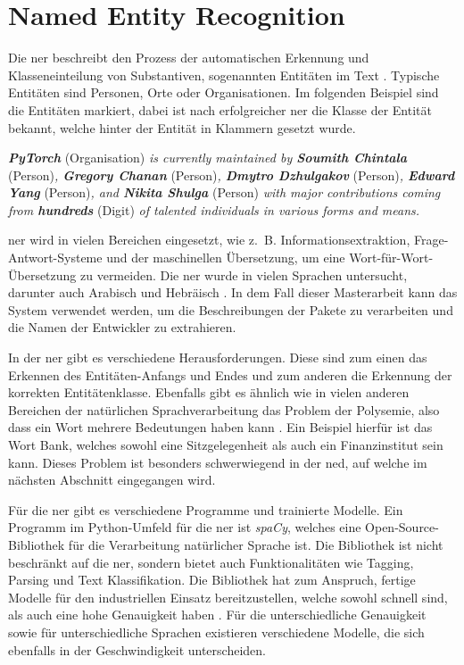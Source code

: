 \section{Named Entity Recognition}
\label{sec:named-entity-recognition}
Die \gls{ner} beschreibt den Prozess der automatischen Erkennung und Klasseneinteilung von Substantiven, sogenannten Entitäten im Text \autocite{mohit_named_2014}.
Typische Entitäten sind Personen, Orte oder Organisationen.
Im folgenden Beispiel sind die Entitäten markiert, dabei ist nach erfolgreicher \gls{ner} die Klasse der Entität bekannt, welche hinter der Entität in Klammern gesetzt wurde.

\begin{addmargin}[25pt]{0pt}
    \emph{\textbf{PyTorch}} (Organisation) \emph{is currently maintained by \textbf{Soumith Chintala}} (Person)\emph{, \textbf{Gregory Chanan}} (Person)\emph{, \textbf{Dmytro Dzhulgakov}} (Person)\emph{, \textbf{Edward Yang}} (Person)\emph{, and \textbf{Nikita Shulga}} (Person) \emph{with major contributions coming from \textbf{hundreds}} (Digit) \emph{of talented individuals in various forms and means.}
\end{addmargin}

\gls{ner} wird in vielen Bereichen eingesetzt, wie z.~B. Informationsextraktion, Frage-Antwort-Systeme und der maschinellen Übersetzung, um eine Wort-für-Wort-Übersetzung zu vermeiden.
Die \gls{ner} wurde in vielen Sprachen untersucht, darunter auch Arabisch und Hebräisch \autocite{mohit_named_2014}.
In dem Fall dieser Masterarbeit kann das System verwendet werden, um die Beschreibungen der Pakete zu verarbeiten und die Namen der Entwickler zu extrahieren.

In der \gls{ner} gibt es verschiedene Herausforderungen.
Diese sind zum einen das Erkennen des Entitäten-Anfangs und Endes und zum anderen die Erkennung der korrekten Entitätenklasse.
Ebenfalls gibt es ähnlich wie in vielen anderen Bereichen der natürlichen Sprachverarbeitung das Problem der Polysemie, also dass ein Wort mehrere Bedeutungen haben kann \autocite{mohit_named_2014}.
Ein Beispiel hierfür ist das Wort \glqq Bank\grqq{}, welches sowohl eine Sitzgelegenheit als auch ein Finanzinstitut sein kann.
Dieses Problem ist besonders schwerwiegend in der \gls{ned}, auf welche im nächsten Abschnitt eingegangen wird.

Für die \gls{ner} gibt es verschiedene Programme und trainierte Modelle.
Ein Programm im Python-Umfeld für die \gls{ner} ist \emph{spaCy}, welches eine Open-Source-Bibliothek für die Verarbeitung natürlicher Sprache ist.
Die Bibliothek ist nicht beschränkt auf die \gls{ner}, sondern bietet auch Funktionalitäten wie Tagging, Parsing und Text Klassifikation.
Die Bibliothek hat zum Anspruch, fertige Modelle für den industriellen Einsatz bereitzustellen, welche sowohl schnell sind, als auch eine hohe Genauigkeit haben \autocite{honnibal_spacy_2024}.
Für die unterschiedliche Genauigkeit sowie für unterschiedliche Sprachen existieren verschiedene Modelle, die sich ebenfalls in der Geschwindigkeit unterscheiden.
